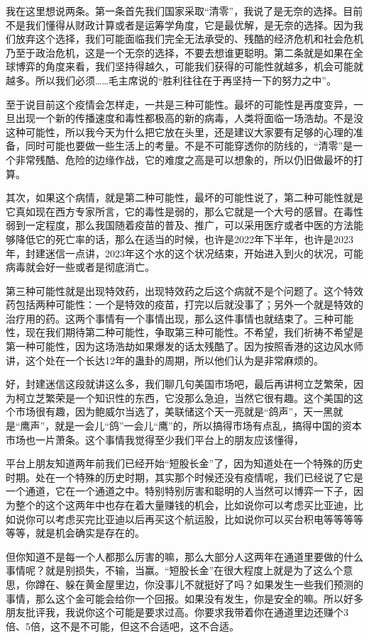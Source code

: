 \documentclass[UTF8, 12pt, a4paper]{ctexrep}
\begin{document}
我在这里想说两条。第一条首先我们国家采取“清零”，我说了是无奈的选择。目前不是我们懂得从财政计算或者是运筹学角度，它是最优解，是无奈的选择。因为我们放弃这个选择，我们可能面临我们完全无法承受的、残酷的经济危机和社会危机乃至于政治危机，这是一个无奈的选择，不要去想谁更聪明。第二条就是如果在全球博弈的角度来看，我们坚持得越久，可能我们获得的可能性就越多，机会可能就越多。所以我们必须……毛主席说的“胜利往往在于再坚持一下的努力之中”。

至于说目前这个疫情会怎样走，一共是三种可能性。最坏的可能性是再度变异，一旦出现一个新的传播速度和毒性都极高的新的病毒，人类将面临一场浩劫。不是没这种可能性，所以我今天为什么把它放在头里，还是建议大家要有足够的心理的准备，同时可能也要做一些生活上的考量。不是不可能穿透你的防线的，“清零”是一个非常残酷、危险的边缘作战，它的难度之高是可以想象的，所以仍旧做最坏的打算。

其次，如果这个病情，就是第二种可能性，最坏的可能性说了，第二种可能性就是它真如现在西方专家所言，它的毒性是弱的，那么它就是一个大号的感冒。在毒性弱到一定程度，那么我国随着疫苗的普及、推广，可以采用医疗或者中医的方法能够降低它的死亡率的话，那么在适当的时候，也许是2022年下半年，也许是2023年，封建迷信一点讲，2023年这个水的这个状况结束，开始进入到火的状况，可能病毒就会好一些或者是彻底消亡。

第三种可能性就是出现特效药，出现特效药之后这个病就不是个问题了。这个特效药包括两种可能性：一个是特效的疫苗，打完以后就没事了；另外一个就是特效的治疗用的药。这两个事情有一个事情出现，那么这件事情也就结束了。三种可能性，现在我们期待第二种可能性，争取第三种可能性。不希望，我们祈祷不希望是第一种可能性，因为这场浩劫如果爆发的话太残酷了。因为按照香港的这边风水师讲，这个处在一个长达12年的蛊卦的周期，所以他们认为是非常麻烦的。

好，封建迷信这段就讲这么多，我们聊几句美国市场吧，最后再讲柯立芝繁荣，因为柯立芝繁荣是一个知识性的东西，它没那么急迫，当然它很有趣。这个美国的这个市场很有趣，因为鲍威尔当选了，美联储这个天一亮就是“鸽声”，天一黑就是“鹰声”，就是一会儿“鸽”一会儿“鹰”的，所以搞得市场有点乱，搞得中国的资本市场也一片萧条。这个事情我觉得至少我们平台上的朋友应该懂得，

平台上朋友知道两年前我们已经开始“短股长金”了，因为知道处在一个特殊的历史时期。处在一个特殊的历史时期，其实那个时候还没有疫情呢，我们已经说了它是一个通道，它在一个通道之中。特别特别厉害和聪明的人当然可以博弈一下子，因为整个的这个这两年中也存在着大量赚钱的机会，比如说你可以考虑买比亚迪，比如说你可以考虑买完比亚迪以后再买这个航运股，比如说你可以买台积电等等等等等等，就是机会确实是存在的。

但你知道不是每一个人都那么厉害的嘛，那么大部分人这两年在通道里要做的什么事情呢？就是别损失，不输，当赢。“短股长金”在很大程度上就是为了这么个意思，你蹲在、躲在黄金屋里边，你没事儿不就挺好了吗？如果发生一些我们预测的事情，那么这个金可能会给你一个回报。如果没有发生，你是安全的嘛。所以好多朋友批评我，我说你这个可能是要求过高。你要求我带着你在通道里边还赚个3倍、5倍，这不是不可能，但这不合适吧，这不合适。
\end{document}
